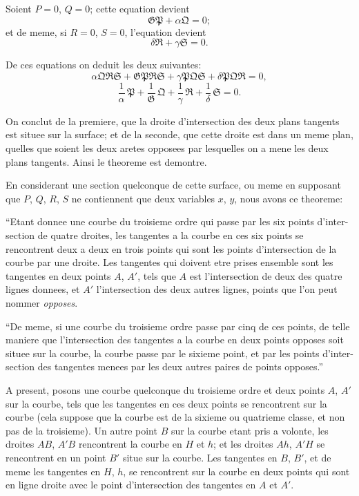 \documentclass[11pt,a4paper]{book}
\begin{document}
Soient $P = 0$, $Q = 0$; cette equation devient
\[\mathfrak{G}\mathfrak{P} + \alpha\mathfrak{Q} = 0;\]
et de meme, si $R = 0$, $S = 0$, l'equation devient
\[\delta\mathfrak{R} + \gamma\mathfrak{S} = 0.\]

De ces equations on deduit les deux suivantes:
\[\alpha\mathfrak{Q}\mathfrak{R}\mathfrak{S} + \mathfrak{G}\mathfrak{P}\mathfrak{R}\mathfrak{S} + \gamma\mathfrak{P}\mathfrak{Q}\mathfrak{S} + \delta\mathfrak{P}\mathfrak{Q}\mathfrak{R} = 0,\]
\[\frac{1}{\alpha}\, \mathfrak{P} + \frac{1}{\mathfrak{G}}\, \mathfrak{Q} + \frac{1}{\gamma}\, \mathfrak{R} + \frac{1}{\delta}\, \mathfrak{S} = 0.\]

On conclut de la premiere, que la droite d'intersection des deux plans tangents est situee
sur la surface; et de la seconde, que cette droite est dans un meme plan, quelles que
soient les deux aretes opposees par lesquelles on a mene les deux plans tangents. Ainsi
le theoreme est demontre.

En considerant une section quelconque de cette surface, ou meme en supposant que
$P$, $Q$, $R$, $S$ ne contiennent que deux variables $x$, $y$, nous avons ce theoreme:

``Etant donnee une courbe du troisieme ordre qui passe par les six points d'inter-
section de quatre droites, les tangentes a la courbe en ces six points se rencontrent deux
a deux en trois points qui sont les points d'intersection de la courbe par une droite.
Les tangentes qui doivent etre prises ensemble sont les tangentes en deux points $A$,
$A'$, tels que $A$ est l'intersection de deux des quatre lignes donnees, et $A'$ l'intersection
des deux autres lignes, points que l'on peut nommer \textit{opposes}.

``De meme, si une courbe du troisieme ordre passe par cinq de ces points, de
telle maniere que l'intersection des tangentes a la courbe en deux points opposes soit
situee sur la courbe, la courbe passe par le sixieme point, et par les points d'inter-
section des tangentes menees par les deux autres paires de points opposes.''

A present, posons une courbe quelconque du troisieme ordre et deux points $A$, $A'$
sur la courbe, tels que les tangentes en ces deux points se rencontrent sur la courbe
(cela suppose que la courbe est de la sixieme ou quatrieme classe, et non pas de la
troisieme). Un autre point $B$ sur la courbe etant pris a volonte, les droites $AB$, $A'B$
rencontrent la courbe en $H$ et $h$; et les droites $Ah$, $A'H$ se rencontrent en un point
$B'$ situe sur la courbe. Les tangentes en $B$, $B'$, et de meme les tangentes en $H$, $h$,
se rencontrent sur la courbe en deux points qui sont en ligne droite avec le point
d'intersection des tangentes en $A$ et $A'$.
\end{document}
